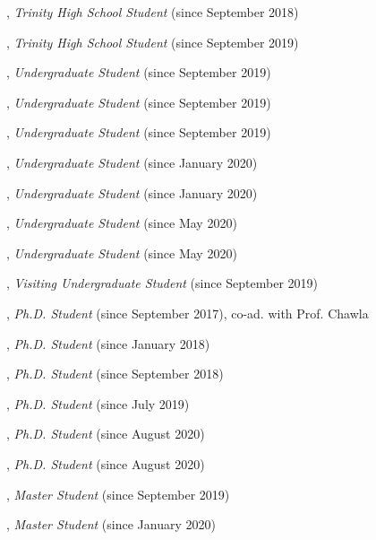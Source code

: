 \documentclass[10pt]{article}
\newenvironment{myindentpar}[1]%
{\begin{list}{}%
         {\setlength{\leftmargin}{#1}}%
         \item[]%
}
{\end{list}}
\newcounter{list}
\begin{document}
\begin{myindentpar}{0.75cm}

\hspace{-0.75cm}{\bf Eric Zhang}, \emph{Trinity High School Student} (since September 2018)

\hspace{-0.75cm}{\bf Michael Florin}, \emph{Trinity High School Student} (since September 2019)

\hspace{-0.75cm}{\bf Xiangyu Dong}, \emph{Undergraduate Student} (since September 2019)

\hspace{-0.75cm}{\bf Tianze Zheng}, \emph{Undergraduate Student} (since September 2019)

\hspace{-0.75cm}{\bf Bo Ni}, \emph{Undergraduate Student} (since September 2019)

\hspace{-0.75cm}{\bf Alvin Alaphat}, \emph{Undergraduate Student} (since January 2020)

\hspace{-0.75cm}{\bf Luke Marushack}, \emph{Undergraduate Student} (since January 2020)

\hspace{-0.75cm}{\bf Michael Lee}, \emph{Undergraduate Student} (since May 2020)

\hspace{-0.75cm}{\bf Ann Hermann}, \emph{Undergraduate Student} (since May 2020)

\hspace{-0.75cm}{\bf Zaitang Li}, \emph{Visiting Undergraduate Student} (since September 2019)

\hspace{-0.75cm}{\bf Daheng Wang}, \emph{Ph.D. Student} (since September 2017), co-ad. with Prof. Chawla

\hspace{-0.75cm}{\bf Qingkai Zeng}, \emph{Ph.D. Student} (since January 2018)

\hspace{-0.75cm}{\bf Tong Zhao}, \emph{Ph.D. Student} (since September 2018)

\hspace{-0.75cm}{\bf Wenhao Yu}, \emph{Ph.D. Student} (since July 2019)

\hspace{-0.75cm}{\bf Mengxia Yu}, \emph{Ph.D. Student} (since August 2020)

\hspace{-0.75cm}{\bf Zhihan Zhang}, \emph{Ph.D. Student} (since August 2020)

\hspace{-0.75cm}{\bf Jianing Li}, \emph{Master Student} (since September 2019)

\hspace{-0.75cm}{\bf Bhakti Sharma}, \emph{Master Student} (since January 2020)

\end{myindentpar}
\end{document}
